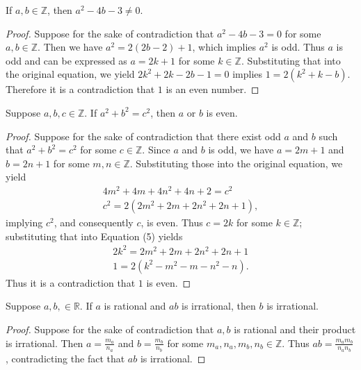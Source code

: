 \documentclass{exam}
\begin{document}
\begin{proposition}{6.7}
    If $a, b\in\mathbb Z$, then $a^2-4b-3\neq0$.
\end{proposition}

\begin{proof}
    Suppose for the sake of contradiction that $a^2-4b-3=0$ for some $a, b\in\mathbb Z$. Then we have $a^2 = 2(2b-2)+1$, which implies $a^2$ is odd. Thus $a$ is odd and can be expressed as $a = 2k+1$ for some $k\in\mathbb Z$. Substituting that into the original equation, we yield $2k^2+2k-2b-1=0$ implies $1 = 2(k^2+k-b)$. Therefore it is a contradiction that $1$ is an even number.
\end{proof}

\begin{proposition}{6.8}
    Suppose $a,b,c\in\mathbb Z$. If $a^2+b^2=c^2$, then $a$ or $b$ is even.
\end{proposition}

\begin{proof}
    Suppose for the sake of contradiction that there exist odd $a$ and $b$ such that $a^2+b^2=c^2$ for some $c\in\mathbb Z$. Since $a$ and $b$ is odd, we have $a = 2m + 1$ and $b = 2n + 1$ for some $m,n\in\mathbb Z$. Substituting those into the original equation, we yield 
    \begin{align}
        4m^2 + 4m + 4n^2 + 4n + 2 = c^2\\
        c^2 = 2(2m^2 + 2m + 2n^2 + 2n + 1),
    \end{align}
    implying $c^2$, and consequently $c$, is even. Thus $c = 2k$ for some $k\in\mathbb Z$; substituting that into Equation (5) yields
    \begin{align*}       
        2k^2 = 2m^2 + 2m + 2n^2 + 2n + 1\\
        1 = 2(k^2 - m^2 - m - n^2 - n).
    \end{align*}
    Thus it is a contradiction that $1$ is even.
\end{proof}

\begin{proposition}{6.9}
    Suppose $a, b,\in\mathbb R$. If $a$ is rational and $ab$ is irrational, then $b$ is irrational.
\end{proposition}

\begin{proof}
    Suppose for the sake of contradiction that $a, b$ is rational and their product is irrational. Then $a = \frac{m_a}{n_a}$ and $b=\frac{m_b}{n_b}$ for some $m_a,n_a,m_b,n_b\in\mathbb Z$. Thus $ab = \frac{m_am_b}{n_an_b}$, contradicting the fact that $ab$ is irrational.
\end{proof}
\end{document}
